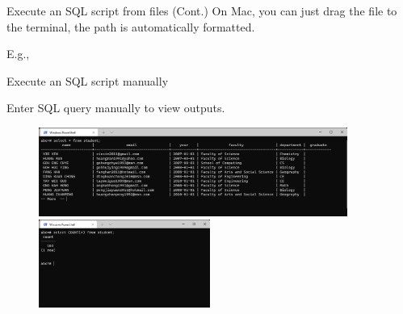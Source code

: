 \begin{frame}[fragile]{Execute an SQL script from files (Cont.)}
	On Mac, you can just drag the file to the terminal, the path is automatically formatted.
	
	E.g., 
	
\end{frame}


\begin{frame}[fragile]{Execute an SQL script manually}
	
	Enter SQL query manually to view outputs.
	\begin{figure}
		\includegraphics[width=0.9\textwidth]{t0-psql/images/8.png}\vspace{10pt}
		\includegraphics[width=0.5\textwidth]{t0-psql/images/9.png}
	\end{figure}
	
\end{frame}

